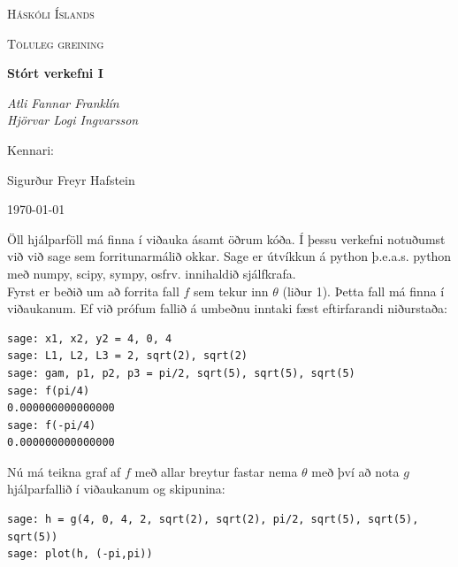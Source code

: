 \documentclass{article}
\begin{document}
\begin{titlepage}
	\centering
	{\scshape\LARGE Háskóli Íslands \par}
	\vspace{1cm}
	{\scshape\Large Töluleg greining \par}
	\vspace{1.5cm}
	{\huge\bfseries Stórt verkefni I \par}
	\vspace{2cm}
	{\Large\itshape Atli Fannar Franklín \\ Hjörvar Logi Ingvarsson\par}
	\vfill
	Kennari: \par
	Sigurður Freyr Hafstein \par 

	\vfill

	{\large \today\par}
\end{titlepage}

Öll hjálparföll má finna í viðauka ásamt öðrum kóða. Í þessu verkefni
notuðumst við við sage sem forritunarmálið okkar. Sage er útvíkkun á python
þ.e.a.s. python með numpy, scipy, sympy, osfrv. innihaldið sjálfkrafa.\\

Fyrst er beðið um að forrita fall $f$ sem tekur inn $\theta$ (liður 1). Þetta fall má finna í viðaukanum. Ef við prófum fallið á umbeðnu inntaki fæst eftirfarandi niðurstaða: \\

\begin{verbatim}
sage: x1, x2, y2 = 4, 0, 4
sage: L1, L2, L3 = 2, sqrt(2), sqrt(2)
sage: gam, p1, p2, p3 = pi/2, sqrt(5), sqrt(5), sqrt(5)
sage: f(pi/4)
0.000000000000000
sage: f(-pi/4)
0.000000000000000
\end{verbatim}

\vspace*{0.5cm}

Nú má teikna graf af $f$ með allar breytur fastar nema $\theta$ með því að nota $g$ hjálparfallið í viðaukanum og skipunina: \\

\begin{small}
\begin{verbatim}
sage: h = g(4, 0, 4, 2, sqrt(2), sqrt(2), pi/2, sqrt(5), sqrt(5), sqrt(5))
sage: plot(h, (-pi,pi))
\end{verbatim}
\end{small}

\vspace*{0.5cm}
\end{document}
